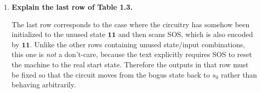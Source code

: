 \documentclass[11pt,openany]{book}
\def\<{\text{\textless}}
\def\>{\text{\textgreater}}
\begin{document}
\begin{enumerate}[{1.}1.]
\begin{enumerate}
\item For $L_7$, use seven states $q_0,\ldots,q_6$, where $q_i$ means that the sum of the digits seen so far is congruent to $i \pmod 7$. The start state is $q_0$, the only final state is $q_0$, and
\[
\delta(q_i,\pmb{d})=q_{ i+d \bmod 7}.
\]

\item The corresponding quintuple is
\[
\langle\{\pmb{0},\pmb{1},\ldots,\pmb{9}\},\{q_0,\ldots,q_6\},q_0,\delta,\{q_0\}\rangle,
\]
with $\delta(q_i,\pmb{d})=q_{ i+d \bmod 7}$.

\item For $L_3$, use three states $r_0,r_1,r_2$, where $r_i$ records the digit sum modulo $3$. Again $r_0$ is both the start state and the only final state, and
\[
\delta(r_i,\pmb{d})=r_{ i+d \bmod 3}.
\]

\item The corresponding quintuple is
\[
\langle\{\pmb{0},\pmb{1},\ldots,\pmb{9}\},\{r_0,r_1,r_2\},r_0,\delta,\{r_0\}\rangle,
\]
with $\delta(r_i,\pmb{d})=r_{ i+d \bmod 3}$.

\item In general,
\[
\langle\{\pmb{0},\pmb{1},\ldots,\pmb{9}\},\{s_0,\ldots,s_{n-1}\},s_0,\delta,\{s_0\}\rangle
\]
recognizes $L_n$ if
\[
\delta(s_i,\pmb{d})=s_{ i+d \bmod n}
\]
for every residue class $i$ and every digit $\pmb{d}$. The state always records the current digit sum modulo $n$.
\end{enumerate}

\item \textbf{Explain the last row of Table 1.3.}

The last row corresponds to the case where the circuitry has somehow been initialized to the unused state $\pmb{11}$ and then scans \<SOS\>, which is also encoded by $\pmb{11}$. Unlike the other rows containing unused state/input combinations, this one is \emph{not} a don't-care, because the text explicitly requires \<SOS\> to reset the machine to the real start state. Therefore the outputs in that row must be fixed so that the circuit moves from the bogus state back to $s_0$ rather than behaving arbitrarily.

\end{enumerate}













\end{document}
